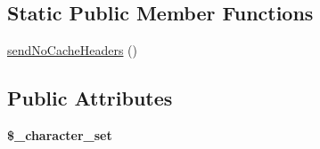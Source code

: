 \subsection*{Static Public Member Functions}
\begin{DoxyCompactItemize}
\item 
\hyperlink{class_html_reporter_a766ff4a9d0fea6de3734a6c9977fb63d}{sendNoCacheHeaders} ()
\end{DoxyCompactItemize}
\subsection*{Public Attributes}
\begin{DoxyCompactItemize}
\item 
\hypertarget{class_html_reporter_a4897748c674a311f3eb70af9ceca59f1}{
{\bfseries \$\_\-character\_\-set}}
\label{class_html_reporter_a4897748c674a311f3eb70af9ceca59f1}

\end{DoxyCompactItemize}



